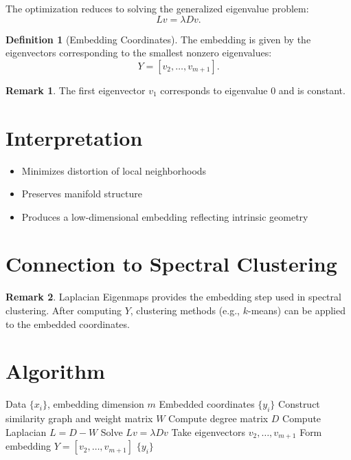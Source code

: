 \documentclass[12pt,oneside]{book}
\numberwithin{equation}{section}
\theoremstyle{definition}
\newtheorem{definition}{Definition}[section]
\newtheorem{remark}{Remark}[section]
\theoremstyle{plain}
\theoremstyle{remark}
\begin{document}
The optimization reduces to solving the generalized eigenvalue problem:
\[
L v = \lambda D v.
\]

\begin{definition}[Embedding Coordinates]
The embedding is given by the eigenvectors corresponding to the smallest nonzero eigenvalues:
\[
Y = [v_2,\dots,v_{m+1}].
\]
\end{definition}

\begin{remark}
The first eigenvector $v_1$ corresponds to eigenvalue $0$ and is constant.
\end{remark}

\section{Interpretation}

\begin{itemize}
    \item Minimizes distortion of local neighborhoods
    \item Preserves manifold structure
    \item Produces a low-dimensional embedding reflecting intrinsic geometry
\end{itemize}

\section{Connection to Spectral Clustering}

\begin{remark}
Laplacian Eigenmaps provides the embedding step used in spectral clustering. After computing $Y$, clustering methods (e.g., $k$-means) can be applied to the embedded coordinates.
\end{remark}

\section{Algorithm}

\begin{algorithm}[H]
\caption{Laplacian Eigenmaps}
\begin{algorithmic}[1]
\Require Data $\{x_i\}$, embedding dimension $m$
\Ensure Embedded coordinates $\{y_i\}$
\State Construct similarity graph and weight matrix $W$
\State Compute degree matrix $D$
\State Compute Laplacian $L = D - W$
\State Solve $L v = \lambda D v$
\State Take eigenvectors $v_2,\dots,v_{m+1}$
\State Form embedding $Y = [v_2,\dots,v_{m+1}]$
\State \Return $\{y_i\}$
\end{algorithmic}
\end{algorithm}
\end{document}
